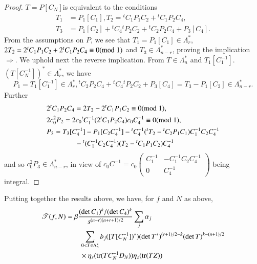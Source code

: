 \begin{proof}
$T=P[C_{N}]$\pageoriginale is equivalent to the conditions
\begin{align*}
T_{1}&=P_{1}[C_{1}], T_{2}={}^{t}C_{1}P_{1}C_{2}+{}^{t}C_{1}P_{2}C_{4},\\
T_{3}&=P_{1}[C_{2}]+{}^{t}C_{4}{}^{t}P_{2}C_{2}+{}^{t}C_{2}P_{2}C_{4}+P_{3}[C_{4}]. 
\end{align*}
From the assumptions on $P$, we see that
$T_{1}=P_{1}[C_{1}]\in\Lambda^{\ast}_{r}$,
$2T_{2}=2{}^{t}C_{1}P_{1}C_{2}+2{}^{t}C_{1}P_{2}C_{4}\equiv 0(\rm{mod} \; 1)$
and $T_{3}\in\Lambda^{\ast}_{n-r}$, proving the implication
$\Longrightarrow$. We uphold next the reverse implication. From
$T\in\Lambda^{\ast}_{n}$ and
$T_{1}[C^{-1}_{1}]$. $(T[C^{-1}_{N}])^{\ast}\in\Lambda^{\ast}_{r}$, we
have
$$
P_{1}=T_{1}[C^{-1}_{1}]\in\Lambda^{\ast}_{r},
{}^{t}C_{2}P_{2}C_{4}+{}^{t}C_{4}{}^{t}P_{2}C_{2}+P_{3}[C_{4}]=T_{3}-P_{1}[C_{2}]\in\Lambda^{\ast}_{n-r}. 
$$
Further
\begin{align*}
&2{}^{t}C_{1}P_{2}C_{4}=2T_{2}-2{}^{t}C_{1}P_{1}C_{2}\equiv 0 (\rm{mod} \; 1),\\
&2c^{2}_{0}P_{2}=2c_{0}{}^{t}C_{1}^{-1}(2{}^{t}C_{1}P_{2}C_{4})c_{0}C^{-1}_{4}\equiv 0(\rm{mod} \; 1),\\
&P_{3}=T_{3}[C^{-1}_{4}]-P_{1}[C_{2}C^{-1}_{4}]-{}^{t}C^{-1}_{4}({}^{t}T_{2}-{}^{t}C_{2}P_{1}C_{1})C^{-1}_{1}C_{2}C^{-1}_{4}\\
&\qquad\qquad-{}^{t}(C^{-1}_{1}C_{2}C^{-1}_{4})(T_{2}-{}^{t}C_{1}P_{1}C_{2})C^{-1}_{4} 
\end{align*}
and so $c^{2}_{0}P_{3}\in \Lambda^{\ast}_{n-r}$, in view of
$c_{0}C^{-1}=c_{0}\left(\begin{smallmatrix} C^{-1}_{1} &
  -C^{-1}_{1}C_{2}C^{-1}_{4}\\ 0 & C^{-1}_{4}
\end{smallmatrix}\right)$ being integral.
\end{proof}

Putting together the results above, we have, for $f$ and $N$ as above,
\begin{align*}
\mathscr{T}(f,N)&=\beta\frac{(\det C_{1})^{k}/(\det
  C_{4})^{k}}{s^{(n-r)(n+r+1)/2}}\sum_{j}\alpha_{j}\\
&\qquad\sum_{0<T\in\Lambda^{\ast}_{n}}b_{j}([T[C^{-1}_{N}])^{\ast})(\det
  T^{\ast})^{(r+1)/2-k}(\det T)^{k-(n+1)/2}\\
&\qquad\times \eta_{s}(\operatorname{tr}(TC^{-1}_{N}D_{N}))\eta_{s}(\operatorname{tr}(TZ))
\end{align*}

